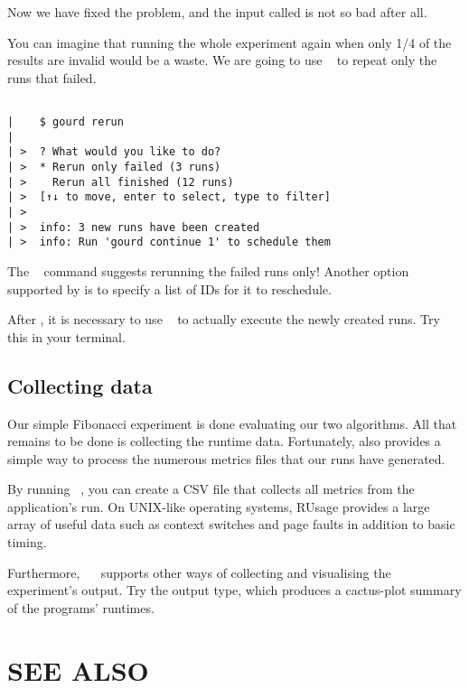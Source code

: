 \documentclass[a4paper,english]{article}
\begin{document}
\begin{adjustwidth}{18pt}{0pt}
\begin{verbatim}
    \end{verbatim}

    Now we have fixed the problem, and the input called  is not
    so bad after all.

    You can imagine that running the whole experiment again when only 1/4 of
    the results are invalid would be a waste. We are going to use
    ~ to repeat only the runs that failed.

    \begin{verbatim}

|    $ gourd rerun
|
| >  ? What would you like to do?
| >  * Rerun only failed (3 runs)
| >    Rerun all finished (12 runs)
| >  [↑↓ to move, enter to select, type to filter]
| >
| >  info: 3 new runs have been created
| >  info: Run 'gourd continue 1' to schedule them

    \end{verbatim}

    The ~ command suggests rerunning the failed runs
    only! Another option supported by  is to specify a list of IDs
    for it to reschedule.

    After , it is necessary to use ~ to
    actually execute the newly created runs. Try this in your terminal.

    \subsection{Collecting data}

    Our simple Fibonacci experiment is done evaluating our two algorithms. All
    that remains to be done is collecting the runtime data. Fortunately,
     also provides a simple way to process the numerous metrics
    files that our runs have generated.

    By running ~, you can create a CSV file that
    collects all metrics from the application's run. On UNIX-like operating
    systems, RUsage provides a large array of useful data such as context
    switches and page faults in addition to basic timing.

    Furthermore, ~~ supports
    other ways of collecting and visualising the experiment's output.
    Try the  output type, which produces a cactus-plot summary
    of the programs' runtimes.

    \section{SEE ALSO}


\end{adjustwidth}
\end{document}
